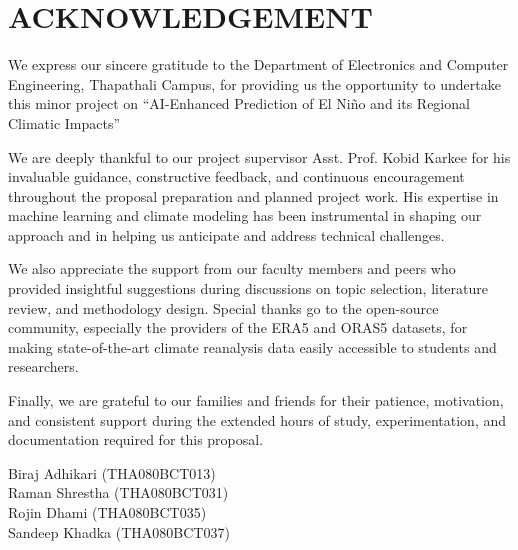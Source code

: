 \chapter*{ACKNOWLEDGEMENT}

\bigskip

We express our sincere gratitude to the Department of Electronics and Computer Engineering, Thapathali Campus, for providing us the opportunity to undertake this minor project on ``AI-Enhanced Prediction of El Ni\~{n}o and its Regional Climatic Impacts''

We are deeply thankful to our project supervisor Asst. Prof. Kobid Karkee for his invaluable guidance, constructive feedback, and continuous encouragement throughout the proposal preparation and planned project work. His expertise in machine learning and climate modeling has been instrumental in shaping our approach and in helping us anticipate and address technical challenges.

We also appreciate the support from our faculty members and peers who provided insightful suggestions during discussions on topic selection, literature review, and methodology design. Special thanks go to the open-source community, especially the providers of the ERA5 and ORAS5 datasets, for making state-of-the-art climate reanalysis data easily accessible to students and researchers.

Finally, we are grateful to our families and friends for their patience, motivation, and consistent support during the extended hours of study, experimentation, and documentation required for this proposal.

\vspace{2em}
\noindent Biraj Adhikari (THA080BCT013) \\
Raman Shrestha (THA080BCT031) \\
Rojin Dhami (THA080BCT035) \\
Sandeep Khadka (THA080BCT037)
